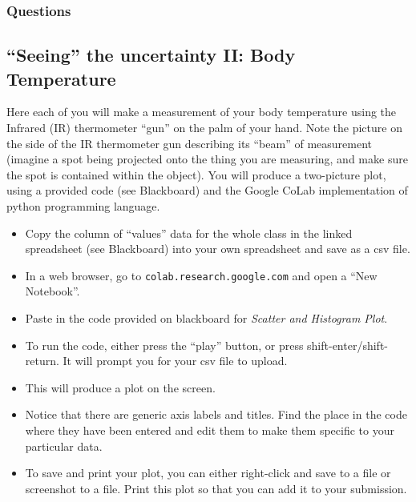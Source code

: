 \subsubsection*{Questions}
\begin{questions}
\end{questions}


\subsection{``Seeing'' the uncertainty II: Body Temperature}

Here each of you will make a measurement of your body temperature using the Infrared (IR) thermometer ``gun'' on the palm of your hand.  Note the picture on the side of the IR thermometer gun describing its ``beam'' of measurement (imagine a spot being projected onto the thing you are measuring, and make sure the spot is contained within the object).  You will produce a two-picture plot, using a provided code (see Blackboard) and the Google CoLab implementation of python programming language.
%
\begin{questions}
\end{questions}
%
\begin{itemize}
\item Copy the column of ``values'' data for the whole class in the linked spreadsheet (see Blackboard) into your own spreadsheet and save as a csv file.
\item In a web browser, go to \verb|colab.research.google.com| and open a ``New Notebook''.
\item Paste in the code provided on blackboard for {\em Scatter and Histogram Plot}.
\item To run the code, either press the ``play'' button, or press shift-enter/shift-return.  It will prompt you for your csv file to upload.
\item This will produce a plot on the screen.
\item Notice that there are generic axis labels and titles.  Find the place in the code where they have been entered and edit them to make them specific to your particular data.
\item To save and print your plot, you can either right-click and save to a file or screenshot to a file.  Print this plot so that you can add it to your submission.
\end{itemize}

